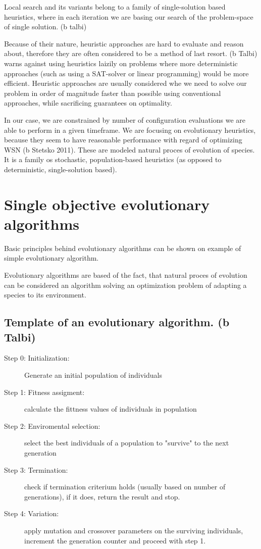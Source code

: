 \documentclass[12pt,oneside,draft]{fithesis2}
\begin{document}
Local search and its variants belong to a family of single-solution based heuristics, where in each iteration we are basing our search of the problem-space of single solution.
(b talbi)

Because of their nature, heuristic approaches are hard to evaluate and reason about, therefore they are often considered to be a method of last resort. (b Talbi) warns against using heuristics laizily on problems where more deterministic approaches (such as using a SAT-solver or linear programming) would be more efficient. Heuristic approaches are usually considered whe we need to solve our problem in order of magnitude faster than possible using conventional approaches, while sacrificing guarantees on optimality.

In our case, we are constrained by number of configuration evaluations we are able to perform in a given timeframe. 
We are focusing on evolutionary heuristics, because they seem to have reasonable performance with regard of optimizing WSN (b Stetsko 2011). 
These are modeled natural proces of evolution of species. It is a family os stochastic, population-based heuristics (as opposed to deterministic, single-solution based). 

\section{Single objective evolutionary algorithms}

Basic principles behind evolutionary algorithms can be shown on example of simple evolutionary algorithm. 

Evolutionary algorithms are based of the fact, that natural proces of evolution can be considered an algorithm solving an optimization problem of adapting a species to its environment. 

\subsection{Template of an evolutionary algorithm. (b Talbi)}

\begin{description}
	\item[Step 0: Initialization:] Generate an initial population of individuals
	\item[Step 1: Fitness assigment:] calculate the fittness values of individuals in population
	\item[Step 2: Enviromental selection:] select the best individuals of a population to "survive" to the next generation
	\item[Step 3: Termination:] check if termination criterium holds (usually based on number of generations), if it does, return the result and stop.
	\item[Step 4: Variation:] apply mutation and crossover parameters on the surviving individuals, increment the generation counter and proceed with step 1.
\end{description}
\end{document}
